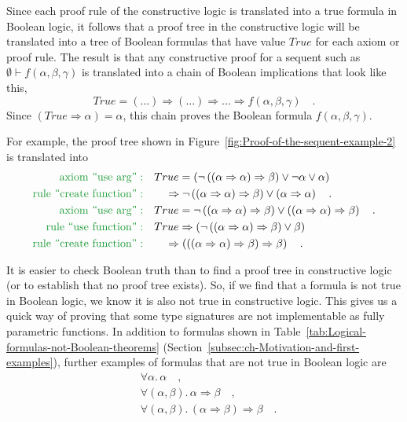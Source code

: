 Since each proof rule of the constructive logic is translated into
a true formula in Boolean logic, it follows that a proof tree in the
constructive logic will be translated into a tree of Boolean formulas
that have value $True$ for each axiom or proof rule. The result is
that any constructive proof for a sequent such as $\emptyset\vdash f(\alpha,\beta,\gamma)$
is translated into a chain of Boolean implications that look like
this,
\[
True=(...)\Rightarrow(...)\Rightarrow...\Rightarrow f(\alpha,\beta,\gamma)\quad.
\]
Since $\left(True\Rightarrow\alpha\right)=\alpha$, this chain proves
the Boolean formula $f(\alpha,\beta,\gamma)$.

For example, the proof tree shown in Figure~\ref{fig:Proof-of-the-sequent-example-2}
is translated into
\begin{align*}
{\color{greenunder}\text{axiom \textsf{``}use arg\textsf{''}}:}\quad & True=\left(\neg\left(\left(\alpha\Rightarrow\alpha\right)\Rightarrow\beta\right)\vee\neg\alpha\vee\alpha\right)\\
{\color{greenunder}\text{rule \textsf{``}create function\textsf{''}}:}\quad & \quad\Rightarrow\neg\left(\left(\alpha\Rightarrow\alpha\right)\Rightarrow\beta\right)\vee\left(\alpha\Rightarrow\alpha\right)\quad.\\
{\color{greenunder}\text{axiom \textsf{``}use arg\textsf{''}}:}\quad & True=\neg\left(\left(\alpha\Rightarrow\alpha\right)\Rightarrow\beta\right)\vee\left(\left(\alpha\Rightarrow\alpha\right)\Rightarrow\beta\right)\quad.\\
{\color{greenunder}\text{rule \textsf{``}use function\textsf{''}}:}\quad & True\Rightarrow\left(\neg\left(\left(\alpha\Rightarrow\alpha\right)\Rightarrow\beta\right)\vee\beta\right)\\
{\color{greenunder}\text{rule \textsf{``}create function\textsf{''}}:}\quad & \quad\Rightarrow\left(\left(\left(\alpha\Rightarrow\alpha\right)\Rightarrow\beta\right)\Rightarrow\beta\right)\quad.
\end{align*}

It is easier to check Boolean truth than to find a proof tree in constructive
logic (or to establish that no proof tree exists). So, if we find
that a formula is not true in Boolean logic, we know it is also not
true in constructive logic. This gives us a quick way of proving that
some type signatures are not implementable as fully parametric functions.
In addition to formulas shown in Table~\ref{tab:Logical-formulas-not-Boolean-theorems}
(Section~\ref{subsec:ch-Motivation-and-first-examples}), further
examples of formulas that are not true in Boolean logic are
\begin{align*}
 & \forall\alpha.\,\alpha\quad,\\
 & \forall(\alpha,\beta).\,\alpha\Rightarrow\beta\quad,\\
 & \forall(\alpha,\beta).\,(\alpha\Rightarrow\beta)\Rightarrow\beta\quad.
\end{align*}


